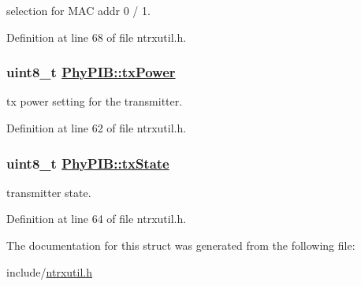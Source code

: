 selection for MAC addr 0 / 1. 

Definition at line 68 of file ntrxutil.h.\hypertarget{structPhyPIB_6d4745474c95ac5ac8f6490c92208b2f}{
\subsubsection[txPower]{\setlength{\rightskip}{0pt plus 5cm}uint8\_\-t \hyperlink{structPhyPIB_6d4745474c95ac5ac8f6490c92208b2f}{Phy\-PIB::tx\-Power}}}
\label{structPhyPIB_6d4745474c95ac5ac8f6490c92208b2f}


tx power setting for the transmitter. 

Definition at line 62 of file ntrxutil.h.\hypertarget{structPhyPIB_6b2e737693233d1e6b05703f8150b1a3}{
\subsubsection[txState]{\setlength{\rightskip}{0pt plus 5cm}uint8\_\-t \hyperlink{structPhyPIB_6b2e737693233d1e6b05703f8150b1a3}{Phy\-PIB::tx\-State}}}
\label{structPhyPIB_6b2e737693233d1e6b05703f8150b1a3}


transmitter state. 

Definition at line 64 of file ntrxutil.h.

The documentation for this struct was generated from the following file:\begin{CompactItemize}
\item 
include/\hyperlink{ntrxutil_8h}{ntrxutil.h}\end{CompactItemize}
